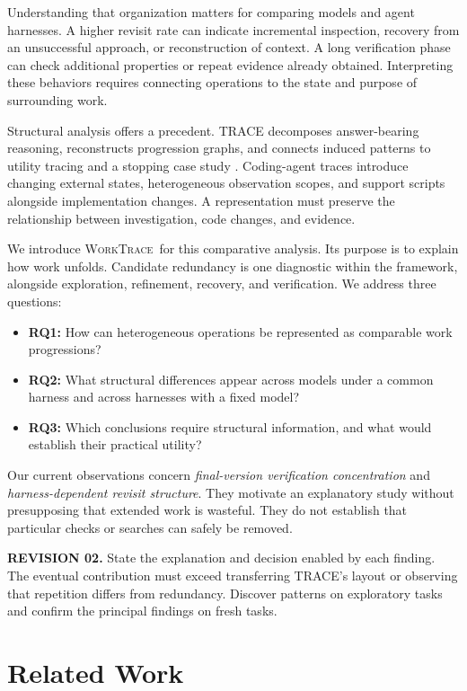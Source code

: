 \documentclass[10pt,a4paper,twocolumn]{article}
\newcommand{\rev}[2]{\par\smallskip\noindent\begin{minipage}{\linewidth}\color{revision}\footnotesize\textbf{REVISION #1.} #2\end{minipage}\par\smallskip}
\newcommand{\wt}{\textsc{WorkTrace}}
\begin{document}
Understanding that organization matters for comparing models and agent harnesses. A higher revisit rate can indicate incremental inspection, recovery from an unsuccessful approach, or reconstruction of context. A long verification phase can check additional properties or repeat evidence already obtained. Interpreting these behaviors requires connecting operations to the state and purpose of surrounding work.

Structural analysis offers a precedent. TRACE decomposes answer-bearing reasoning, reconstructs progression graphs, and connects induced patterns to utility tracing and a stopping case study \citep{trace}. Coding-agent traces introduce changing external states, heterogeneous observation scopes, and support scripts alongside implementation changes. A representation must preserve the relationship between investigation, code changes, and evidence.

We introduce \wt\ for this comparative analysis. Its purpose is to explain how work unfolds. Candidate redundancy is one diagnostic within the framework, alongside exploration, refinement, recovery, and verification. We address three questions:
\begin{itemize}
\setlength{\itemsep}{1pt}\setlength{\topsep}{3pt}
\item \textbf{RQ1:} How can heterogeneous operations be represented as comparable work progressions?
\item \textbf{RQ2:} What structural differences appear across models under a common harness and across harnesses with a fixed model?
\item \textbf{RQ3:} Which conclusions require structural information, and what would establish their practical utility?
\end{itemize}
Our current observations concern \emph{final-version verification concentration} and \emph{harness-dependent revisit structure}. They motivate an explanatory study without presupposing that extended work is wasteful. They do not establish that particular checks or searches can safely be removed.
\rev{02}{State the explanation and decision enabled by each finding. The eventual contribution must exceed transferring TRACE's layout or observing that repetition differs from redundancy. Discover patterns on exploratory tasks and confirm the principal findings on fresh tasks.}

\section{Related Work}
\end{document}
